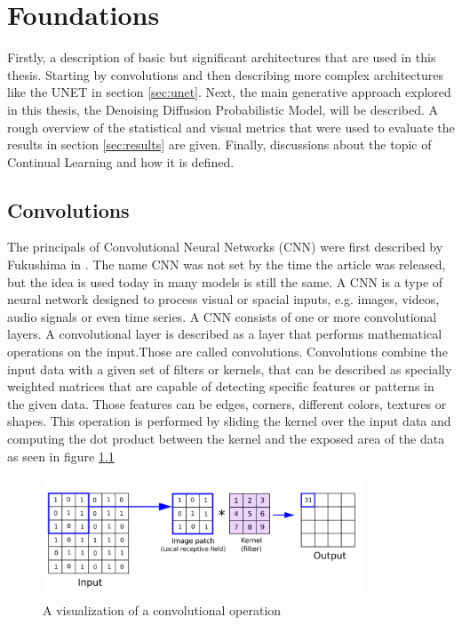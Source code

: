 \chapter{Foundations}
\label{sec:foundations}
Firstly, a description of basic but significant architectures that are used in this thesis. Starting by convolutions and then describing more complex architectures like the UNET in section \ref{sec:unet}. Next, the main generative approach explored in this thesis, the Denoising Diffusion Probabilistic Model, will be described. A rough overview of the statistical and visual metrics that were used to evaluate the results in section \ref{sec:results} are given. Finally, discussions about the topic of Continual Learning and how it is defined.
\section{Convolutions}
\label{sec:convolutions}
The principals of Convolutional Neural Networks (CNN) were first described by Fukushima in \cite{Fukushima1980NeocognitronAS}. The name CNN was not set by the time the article was released,
but the idea is used today in many models is still the same. A CNN is a type of neural network designed to process visual or spacial inputs, e.g. images, videos, audio signals or even time series. \newline
A CNN consists of one or more convolutional layers.
A convolutional layer is described as a layer that performs mathematical operations on the input.Those are called convolutions. Convolutions combine the input data with a given set of
filters or kernels, that can be described as specially weighted matrices that are capable of detecting specific features or patterns in the given data. Those features can be edges, corners, different colors, textures or shapes.
This operation is performed by sliding the kernel over the input data and computing the dot product between the kernel and the exposed area of the data as seen in figure \ref{fig:cnn dot}
\begin{figure}
    \centering
    \includegraphics[width=0.85\textwidth]{images/cnn-dot.png}
    \caption{A visualization of a convolutional operation}
    \label{fig:cnn dot}
\end{figure}
